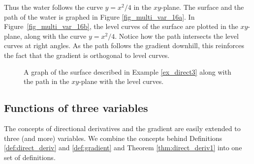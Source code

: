 \begin{example}
Thus the water follows the curve $y=x^2/4$ in the $xy$-plane. The surface and the path of the water is graphed in Figure \ref{fig_multi_var_16a}. In Figure~\ref{fig_multi_var_16b}, the level curves of the surface are plotted in the $xy$-plane, along with the curve $y=x^2/4$. Notice how the path intersects the level curves at right angles. As the path follows the gradient downhill, this reinforces the fact that the gradient is orthogonal to level curves.


\begin{figure}[H]
\centering
\qquad
{}
\caption{A graph of the surface described in Example \ref{ex_direct3} along with the path in the $xy$-plane with the level curves.}
\end{figure}

\end{example}


\ifcalculus
\subsection{Functions of three variables}
The concepts of directional derivatives and the gradient are easily extended to three (and more) variables. We combine the concepts behind Definitions \ref{def:direct_deriv} and \ref{def:gradient} and Theorem \ref{thm:direct_deriv1} into one set of definitions.

